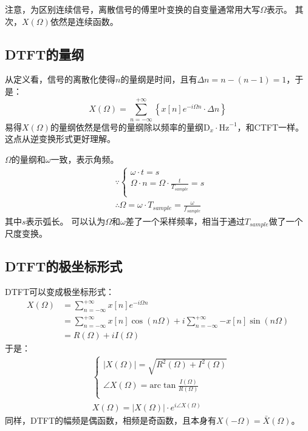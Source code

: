 \begin{tcolorbox}
注意，为区别连续信号，离散信号的傅里叶变换的自变量通常用大写$\varOmega $表示。
其次，$X\left( \varOmega \right) $依然是连续函数。
\end{tcolorbox}

\subsection{DTFT的量纲}

从定义看，信号的离散化使得$n$的量纲是时间，且有$\Delta n=n-\left( n-1 \right) =1$，于是：
\[
X\left( \varOmega \right) =\sum_{n=-\infty}^{+\infty}{\left\{ x\left[ n \right] e^{-i\varOmega n}\cdot \Delta n \right\}}
\]
易得$X\left( \varOmega \right) $的量纲依然是信号的量纲除以频率的量纲$\mathrm{D}_x\cdot \mathrm{Hz}^{-1}$，和CTFT一样。
这点从逆变换形式更好理解。

$\varOmega $的量纲和$\omega $一致，表示角频。
\begin{align*}
&\because \begin{cases}
	\omega \cdot t=s\\
	\varOmega \cdot n=\varOmega \cdot \frac{t}{T_{sample}}=s\\
\end{cases} \\
&\therefore \varOmega =\omega \cdot T_{sample}=\frac{\omega}{f_{sample}}
\end{align*}
其中$s$表示弧长。
可以认为$\varOmega $和$\omega $差了一个采样频率，相当于通过$T_{sample}$做了一个尺度变换。

\subsection{DTFT的极坐标形式}

DTFT可以变成极坐标形式：
\begin{align*}
X\left( \varOmega \right) &=\sum_{n=-\infty}^{+\infty}{x\left[ n \right] e^{-i\varOmega n}} \\
&=\sum_{n=-\infty}^{+\infty}{x\left[ n \right] \cos \left( n\varOmega \right)}+i\sum_{n=-\infty}^{+\infty}{-x\left[ n \right] \sin \left( n\varOmega \right)} \\
&=R\left( \varOmega \right) +iI\left( \varOmega \right)
\end{align*}
于是：
\begin{align*}
&\begin{cases}
	\left| X\left( \varOmega \right) \right|=\sqrt{R^2\left( \varOmega \right) +I^2\left( \varOmega \right)}\\
	\angle X\left( \varOmega \right) =\mathrm{arc}\tan \frac{I\left( \varOmega \right)}{R\left( \varOmega \right)}\\
\end{cases} \\
&X\left( \varOmega \right) =\left| X\left( \varOmega \right) \right|\cdot e^{i\angle X\left( \varOmega \right)}
\end{align*}
同样，DTFT的幅频是偶函数，相频是奇函数，且本身有$X\left( -\varOmega \right) =\bar{X}\left( \varOmega \right) $。

